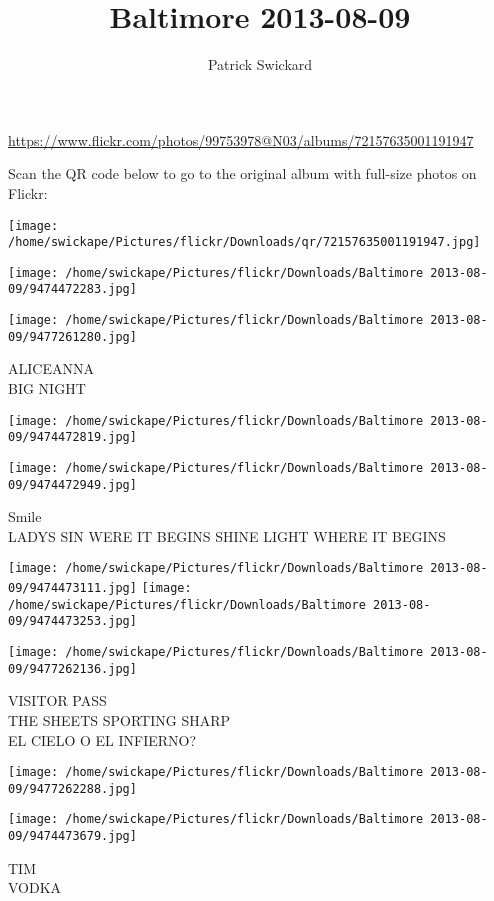 \documentclass[10pt,letterpaper]{article}
\title{Baltimore 2013-08-09}
\author{Patrick Swickard}
\date{}
\begin{document}
\maketitle

\url{https://www.flickr.com/photos/99753978@N03/albums/72157635001191947}

Scan the QR code below to go to the original album with full-size photos on Flickr:

\texttt{[image: /home/swickape/Pictures/flickr/Downloads/qr/72157635001191947.jpg]}
\pagebreak

\texttt{[image: /home/swickape/Pictures/flickr/Downloads/Baltimore 2013-08-09/9474472283.jpg]}

\vspace{0.25in}
\texttt{[image: /home/swickape/Pictures/flickr/Downloads/Baltimore 2013-08-09/9477261280.jpg]}

ALICEANNA\\
BIG NIGHT
\pagebreak

\texttt{[image: /home/swickape/Pictures/flickr/Downloads/Baltimore 2013-08-09/9474472819.jpg]}

\vspace{0.25in}
\texttt{[image: /home/swickape/Pictures/flickr/Downloads/Baltimore 2013-08-09/9474472949.jpg]}

Smile\\
LADYS SIN WERE IT BEGINS SHINE LIGHT WHERE IT BEGINS
\pagebreak

\texttt{[image: /home/swickape/Pictures/flickr/Downloads/Baltimore 2013-08-09/9474473111.jpg]}
\texttt{[image: /home/swickape/Pictures/flickr/Downloads/Baltimore 2013-08-09/9474473253.jpg]}

\texttt{[image: /home/swickape/Pictures/flickr/Downloads/Baltimore 2013-08-09/9477262136.jpg]}

VISITOR PASS\\
THE SHEETS SPORTING SHARP\\
EL CIELO O EL INFIERNO?
\pagebreak

\texttt{[image: /home/swickape/Pictures/flickr/Downloads/Baltimore 2013-08-09/9477262288.jpg]}

\vspace{0.25in}
\texttt{[image: /home/swickape/Pictures/flickr/Downloads/Baltimore 2013-08-09/9474473679.jpg]}

TIM\\
VODKA
\pagebreak
\end{document}
